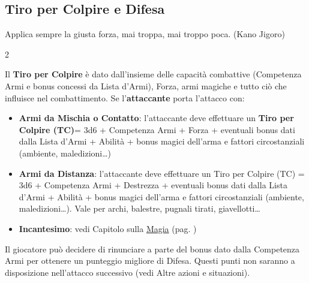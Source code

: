 \pagebreak

\subsection{Tiro per Colpire e Difesa}\label{tiropercolpireedifesa}\hypertarget{tiropercolpireedifesa}{}

\begin{enfasi}{Applica sempre la giusta forza, mai troppa, mai troppo poca. (Kano Jigoro)}\end{enfasi}

\begin{multicols}{2}

Il \textbf{Tiro per Colpire} è dato dall'insieme delle capacità combattive (Competenza Armi e bonus concessi da Lista d'Armi), Forza, armi magiche e tutto ciò che influisce nel combattimento. Se l'\textbf{attaccante} porta l'attacco con:

\begin{itemize}[leftmargin=*] \setlength{\itemsep}{0pt}
\item \textbf{Armi da Mischia o Contatto}: l'attaccante deve effettuare un \textbf{Tiro per Colpire (TC)}= 3d6 + Competenza Armi + Forza + eventuali bonus dati dalla Lista d'Armi + Abilità + bonus magici dell'arma e fattori circostanziali (ambiente, maledizioni…)

\item
\textbf{Armi da Distanza}: l'attaccante deve effettuare un Tiro per Colpire (TC) = 3d6 + Competenza Armi + Destrezza + eventuali bonus dati dalla Lista d'Armi + Abilità + bonus magici dell'arma e fattori circostanziali (ambiente, maledizioni…). Vale per archi, balestre, pugnali tirati, giavellotti…

\item
\textbf{Incantesimo}: vedi Capitolo sulla \hyperlink{magietiropercolpireconlemagie}{Magia} (pag. \pageref{magietiropercolpireconlemagie})
\end{itemize}

Il giocatore può decidere di rinunciare a parte del bonus dato dalla Competenza Armi per ottenere un punteggio migliore di Difesa. Questi punti non saranno a disposizione nell'attacco successivo (vedi Altre azioni e situazioni).





\end{multicols}

